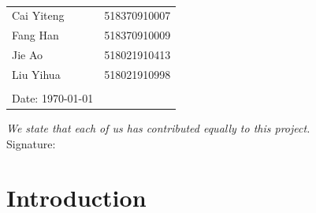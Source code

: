\documentclass[12pt]{report}
\begin{document}
\setlength{\parindent}{1em}
\vspace*{0.25cm}
\hrulefill
\thispagestyle{empty}
\begin{center}
    \begin{large}
    \end{large}
    \hrulefill
    \vspace*{5cm}\\
    \begin{large}
    \end{large}
\end{center}
\vfill
\begin{large}
\end{large}
\begin{table}[h!]
    \flushleft
    \begin{tabular}{ll}
        Cai Yiteng \hspace*{3em}&518370910007\hspace*{3em}\\
        Fang Han \hspace*{3em}&518370910009\hspace*{3em}\\
        Jie Ao \hspace*{3em}&518021910413\hspace*{3em}\\
        Liu Yihua \hspace*{3em}&518021910998\hspace*{3em}\\
        \\
        Date: \today
    \end{tabular}
\end{table}

\textit{We state that each of us has contributed equally to this project.}\\

Signature:\underline{\makebox[25em]{                                         }}
\hfill
\clearpage
\renewcommand{\thesection}{\arabic{section}}
\section{Introduction}
\end{document}
